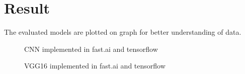 \documentclass[11pt]{article}
\begin{document}
	\section[result]{Result}%
	\label{sec:result}

	The evaluated models are plotted on graph for better understanding of data.

	\begin{figure}[H]
		\centering
		\hspace{0.5cm}
		\caption{CNN implemented in fast.ai and tensorflow}
		\label{CNN in fast.ai and tensorflow}
	\end{figure}

	\begin{figure}[H]
		\centering
		\hspace{0.5cm}
		\caption{VGG16 implemented in fast.ai and tensorflow}
		\label{VGG16 in fast.ai and tensorflow}
	\end{figure}
\end{document}
